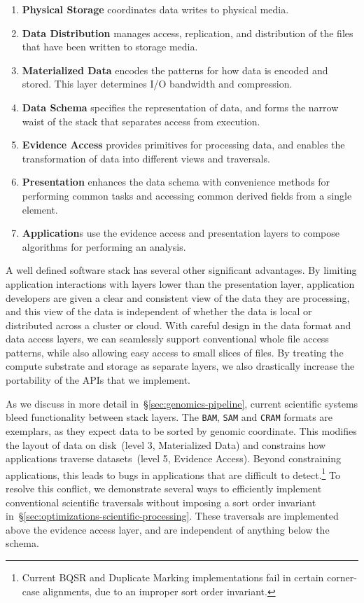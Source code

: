 \documentclass{sig-alternate}
\begin{document}
\begin{enumerate}
\item {\bf Physical Storage} coordinates data writes to physical media.
\item {\bf Data Distribution} manages access, replication, and distribution of the files that have
been written to storage media.
\item {\bf Materialized Data} encodes the patterns for how data is encoded and stored. This
layer determines I/O bandwidth and compression.
\item {\bf Data Schema} specifies the representation of data, and forms the narrow waist of
the stack that separates access from execution.
\item {\bf Evidence Access} provides primitives for processing data, and enables the transformation of
data into different views and traversals.
\item {\bf Presentation} enhances the data schema with convenience methods for performing
common tasks and accessing common derived fields from a single element.
\item {\bf Application}s use the evidence access and presentation layers to compose
algorithms for performing an analysis.
\end{enumerate}

A well defined software stack has several other significant advantages. By limiting application
interactions with layers lower than the presentation layer, application developers are given a clear and
consistent view of the data they are processing, and this view of the data is independent of whether the
data is local or distributed across a cluster or cloud. With careful design in the data format and data access layers,
we can seamlessly
support conventional whole file access patterns, while also allowing easy access to small slices of files.
By treating the compute substrate and storage as separate layers, we also drastically increase
the portability of the APIs that we implement.

As we discuss in more detail in~\S\ref{sec:genomics-pipeline}, current scientific systems bleed functionality between
stack layers. The \texttt{BAM}, \texttt{SAM} and \texttt{CRAM} formats are exemplars, as they expect data
to be sorted by genomic coordinate. This modifies the layout of data on disk~(level 3, Materialized Data)
and constrains how applications traverse datasets~(level 5, Evidence Access). Beyond
constraining applications, this leads to bugs in applications that are difficult to detect.\footnote{Current BQSR and
Duplicate Marking implementations fail in certain corner-case alignments, due to an improper sort order invariant.}
To resolve this conflict, we demonstrate several ways to efficiently implement conventional scientific
traversals without imposing a sort order invariant in~\S\ref{sec:optimizations-scientific-processing}. These traversals
are implemented above the evidence access layer, and are independent of anything below the schema.
\end{document}
